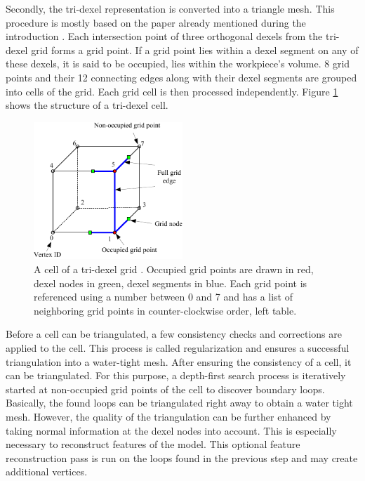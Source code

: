 Secondly, the tri-dexel representation is converted into a triangle mesh.
This procedure is mostly based on the paper already mentioned during the introduction \cite{tridexel_reconstruction}.
Each intersection point of three orthogonal dexels from the tri-dexel grid forms a grid point.
If a grid point lies within a dexel segment on any of these dexels, it is said to be occupied, \ie lies within the workpiece's volume.
8 grid points and their 12 connecting edges along with their dexel segments are grouped into cells of the grid.
Each grid cell is then processed independently.
Figure \ref{fig:tri_dexel_cell} shows the structure of a tri-dexel cell.
%
\begin{figure}
	\centering
	\includegraphics[width=0.5\textwidth]{images/tri_dexel_cell}
	\caption{
		A cell of a tri-dexel grid \cite{tridexel_reconstruction}.
		Occupied grid points are drawn in red, dexel nodes in green, dexel segments in blue.
		Each grid point is referenced using a number between 0 and 7 and has a list of neighboring grid points in counter-clockwise order, \cf left table.
	}
	\label{fig:tri_dexel_cell}
\end{figure}
%
Before a cell can be triangulated, a few consistency checks and corrections are applied to the cell.
This process is called regularization and ensures a successful triangulation into a water-tight mesh.
After ensuring the consistency of a cell, it can be triangulated.
For this purpose, a depth-first search process is iteratively started at non-occupied grid points of the cell to discover boundary loops.
Basically, the found loops can be triangulated right away to obtain a water tight mesh.
However, the quality of the triangulation can be further enhanced by taking normal information at the dexel nodes into account.
This is especially necessary to reconstruct features of the model.
This optional feature reconstruction pass is run on the loops found in the previous step and may create additional vertices.


